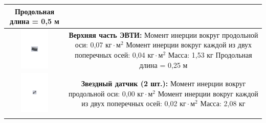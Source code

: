 \begin{table}[ht!]
\begin{tabular}{|c|c|}
{                Продольная длина = 0,5 м \\
                \rule{0pt}{2mm}
            } \\
        \hline
            \includegraphics[height=20mm, keepaspectratio]
                            {./src/pictures/sattelite_3d_images/top_shell_part} &
            \shortstack[l] {
                \rule{0pt}{2mm} \\
                \textbf{Верхняя часть ЭВТИ:} \\
                Момент инерции вокруг продольной оси: 0,07 $\text{кг} \cdot \text{м}^{2}$ \\
                Момент инерции вокруг каждой из двух поперечных  осей: 0,04 $\text{кг} \cdot \text{м}^{2}$ \\
                Масса: 1,53 кг \\
                Продольная длина = 0,25 м \\
                \rule{0pt}{2mm}
            } \\
        \hline
            \includegraphics[height=20mm, keepaspectratio]
                            {./src/pictures/sattelite_3d_images/star_sensor} &
            \shortstack[l] {
                \rule{0pt}{2mm} \\
                \textbf{Звездный датчик (2 шт.):} \\
                Момент инерции вокруг продольной оси: 0,00 $\text{кг} \cdot \text{м}^{2}$ \\
                Момент инерции вокруг каждой из двух поперечных  осей: 0,02 $\text{кг} \cdot \text{м}^{2}$ \\
                Масса: 2,08 кг \\
                \rule{0pt}{2mm}
            } \\
        \hline
            \includegraphics[height=20mm, keepaspectratio]

\end{tabular}
\end{table}
